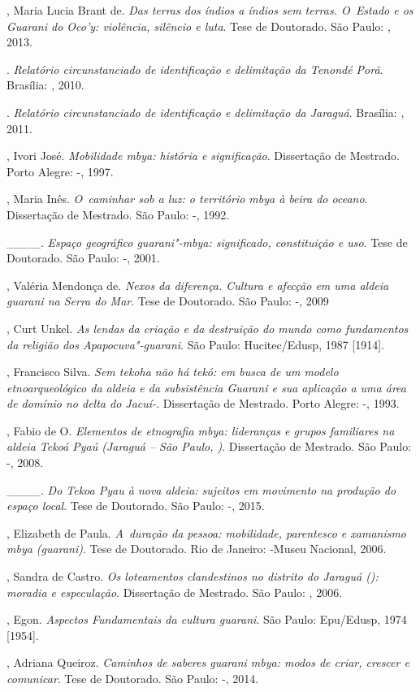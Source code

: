 \begin{Parskip}
, Maria Lucia Brant de. \emph{Das terras dos índios a índios sem
terras. O~Estado e os Guarani do Oco’y: violência, silêncio e luta}.
Tese de Doutorado. São Paulo: , 2013.

. \emph{Relatório circunstanciado de identificação e delimitação da 
Tenondé Porã}. Brasília: , 2010.

. \emph{Relatório circunstanciado de identificação e delimitação da 
Jaraguá}. Brasília: , 2011.

, Ivori José. \emph{Mobilidade mbya: história e significação}.
Dissertação de Mestrado. Porto Alegre: -, 1997.

, Maria Inês. \emph{O~caminhar sob a luz: o território mbya à beira do
oceano}. Dissertação de Mestrado. São Paulo: -, 1992. 

\_\_\_\_. \emph{Espaço geográfico guarani"-mbya: significado, constituição e
uso}. Tese de Doutorado. São Paulo: -, 2001.

, Valéria Mendonça de. \emph{Nexos da diferença. Cultura e afecção em
uma aldeia guarani na Serra do Mar}. Tese de Doutorado. São Paulo:
-, 2009

, Curt Unkel. \emph{As lendas da criação e da destruição do mundo
como fundamentos da religião dos Apapocuva"-guarani}. São Paulo:
Hucitec/Edusp, 1987 [1914].

, Francisco Silva. \emph{Sem tekoha não há tekó: em busca de um modelo
etnoarqueológico da aldeia e da subsistência Guarani e sua aplicação a
uma área de domínio no delta do Jacuí-}. Dissertação de Mestrado.
Porto Alegre: -, 1993.

  , Fabio de O. \emph{Elementos de etnografia mbya: lideranças
e grupos familiares na aldeia Tekoá Pyaú (Jaraguá -- São Paulo, )}.
Dissertação de Mestrado. São Paulo: -, 2008.

\_\_\_\_. \emph{Do Tekoa Pyau à nova aldeia: sujeitos em movimento na produção do
espaço local}. Tese de Doutorado. São Paulo: -, 2015.

, Elizabeth de Paula. \emph{A~duração da pessoa: mobilidade,
parentesco e xamanismo mbya (guarani)}. Tese de Doutorado. Rio de
Janeiro: -Museu Nacional, 2006. 

, Sandra de Castro. \emph{Os loteamentos clandestinos no distrito do
Jaraguá (): moradia e especulação}. Dissertação de Mestrado. São
Paulo: , 2006.

, Egon. \emph{Aspectos Fundamentais da cultura guarani}. São Paulo:
Epu/Edusp, 1974 [1954].

, Adriana Queiroz. \emph{Caminhos de saberes guarani mbya: modos de
criar, crescer e comunicar}. Tese de Doutorado. São Paulo: -,
2014.
\end{Parskip}

